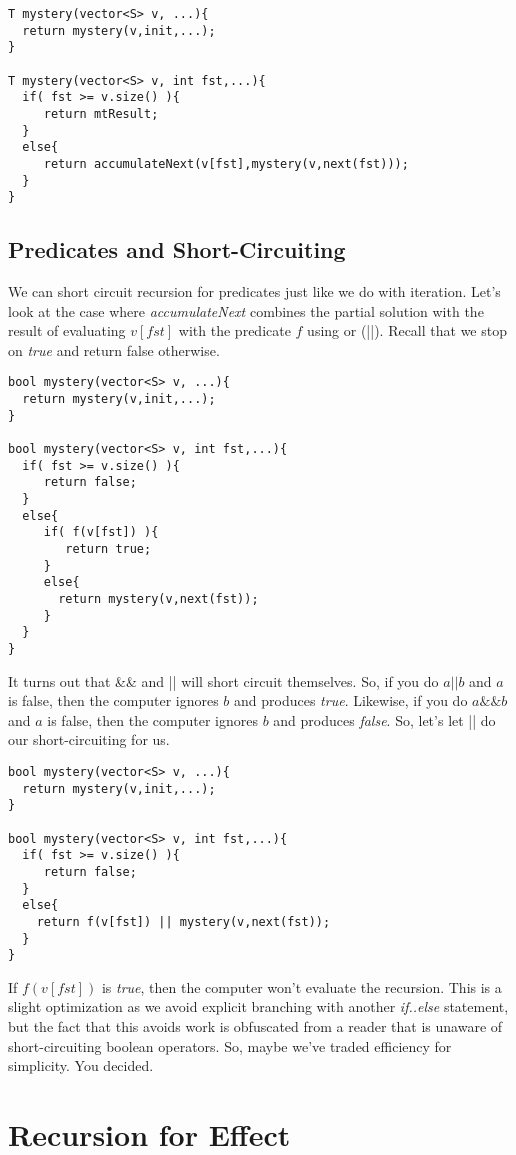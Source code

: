 \documentclass[]{tufte-handout}
\begin{document}
\begin{verbatim}
T mystery(vector<S> v, ...){
  return mystery(v,init,...);
}

T mystery(vector<S> v, int fst,...){
  if( fst >= v.size() ){
     return mtResult;
  }
  else{
     return accumulateNext(v[fst],mystery(v,next(fst)));
  }
}
\end{verbatim}

\subsection{Predicates and Short-Circuiting}

We can short circuit recursion for predicates just like we do with iteration. Let's look at the case where \textit{accumulateNext} combines the partial solution with the result of evaluating $v[fst]$ with the predicate $f$ using or (||). Recall that we stop on \textit{true} and return false otherwise.
\begin{verbatim}
bool mystery(vector<S> v, ...){
  return mystery(v,init,...);
}

bool mystery(vector<S> v, int fst,...){
  if( fst >= v.size() ){
     return false;
  }
  else{
     if( f(v[fst]) ){
        return true;
     }
     else{
       return mystery(v,next(fst));
     }
  }
}
\end{verbatim}

It turns out that \&\& and || will short circuit themselves.  So, if you do $a || b$ and $a$ is false, then the computer ignores $b$ and produces \textit{true}. Likewise, if you do $a \&\& b$ and $a$ is false, then the computer ignores $b$ and produces \textit{false}. So, let's let || do our short-circuiting for us.
\begin{verbatim}
bool mystery(vector<S> v, ...){
  return mystery(v,init,...);
}

bool mystery(vector<S> v, int fst,...){
  if( fst >= v.size() ){
     return false;
  }
  else{
    return f(v[fst]) || mystery(v,next(fst));
  }
}
\end{verbatim}
If $f(v[fst])$ is \textit{true}, then the computer won't evaluate the recursion. This is a slight optimization as we avoid explicit branching with another \textit{if..else} statement, but the fact that this avoids work is obfuscated from a reader that is unaware of short-circuiting boolean operators.  So, maybe we've traded efficiency for simplicity. You decided.

\section{Recursion for Effect}
\end{document}
